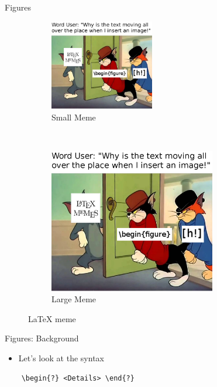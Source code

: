 \begin{frame}{Figures}
\vspace{-2em}
    \begin{figure}[t!]
    \centering
    \begin{subfigure}[t]{0.5\textwidth}
        \centering
        \includegraphics[width=0.5\textwidth]{sections/begin_figure_meme.png}
        \caption{Small Meme}
    \end{subfigure}%
    ~ 
    \begin{subfigure}[t]{0.5\textwidth}
        \centering
        \includegraphics[width=0.8\textwidth]{sections/begin_figure_meme.png}
        \caption{Large Meme}
    \end{subfigure}
    \caption{\LaTeX\: meme}
    \label{fig:meme}
\end{figure}
\end{frame}

\begin{frame}[fragile]{Figures: Background}
\begin{itemize}
    \item Let's look at the syntax
\end{itemize}
\begin{verbatim}
    \begin{?} <Details> \end{?}
\end{verbatim}
\end{frame}

